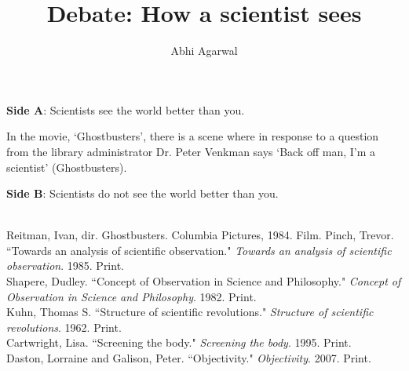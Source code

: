 \documentclass[11pt, oneside]{article}
\title{Debate: How a scientist sees\vspace{-0.4cm}}
\author{Abhi Agarwal\vspace{-1cm}}
\date{}
\begin{document}
\maketitle


\noindent \textbf{Side A}: Scientists see the world better than you.

\par In the movie, `Ghostbusters', there is a scene where in response to a question from the library administrator Dr. Peter Venkman says `Back off man, I'm a scientist' (Ghostbusters). 

\newpage

\noindent \textbf{Side B}: Scientists do not see the world better than you.


\begin{workscited}
\bibent \\
\bibent Reitman, Ivan, dir. Ghostbusters. Columbia Pictures, 1984. Film.
\bibent Pinch, Trevor. ``Towards an analysis of scientific observation."  \textit{Towards an analysis of scientific observation}.  1985. Print. \\
\bibent Shapere, Dudley. ``Concept of Observation in Science and Philosophy."  \textit{Concept of Observation in Science and Philosophy}.  1982. Print. \\
\bibent Kuhn, Thomas S. ``Structure of scientific revolutions."  \textit{Structure of scientific revolutions}.  1962. Print. \\
\bibent Cartwright, Lisa. ``Screening the body."  \textit{Screening the body}.  1995. Print. \\
\bibent Daston, Lorraine and Galison, Peter. ``Objectivity."  \textit{Objectivity}.  2007. Print. \\
\end{workscited}
\end{document}
